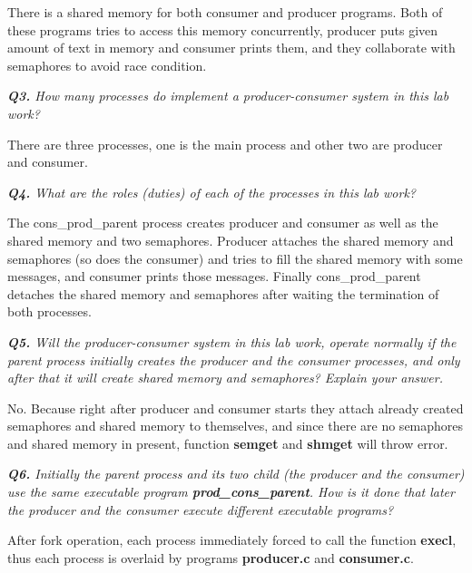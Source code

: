 \documentclass[11pt]{article}
\begin{document}
There is a shared memory for both consumer and producer programs. Both of these programs tries to access this memory concurrently, producer puts given amount of text in memory and consumer prints them, and they collaborate with semaphores to avoid race condition. 


\vspace{5mm}
\textit{\textbf{Q3.} How many processes do implement a producer-consumer system in this lab work?}
\vspace{5mm}

There are three processes, one is the main process and other two are producer and consumer.

\vspace{5mm}
\textit{\textbf{Q4.} What are the roles (duties) of each of the processes in this lab work?}
\vspace{5mm}

The cons\_prod\_parent process creates producer and consumer as well as the shared memory and two semaphores. Producer attaches the shared memory and semaphores (so does the consumer) and tries to fill the shared memory with some messages, and consumer prints those messages. Finally cons\_prod\_parent detaches the shared memory and semaphores after waiting the termination of both processes.

\vspace{5mm}
\textit{\textbf{Q5.} Will the producer-consumer system in this lab work, operate normally if the parent process initially creates the producer and the consumer processes, and only after that it will create shared memory and semaphores? Explain your answer.}
\vspace{5mm}

No. Because right after producer and consumer starts they attach already created semaphores and shared memory to themselves, and since there are no semaphores and shared memory in present, function \textbf{semget} and \textbf{shmget} will throw error.

\vspace{5mm}
\textit{\textbf{Q6.} Initially the parent process and its two child (the producer and the consumer) use the same executable program \textbf{prod\_cons\_parent}. How is it done that later the producer and the consumer execute different executable programs?}
\vspace{5mm}

After fork operation, each process immediately forced to call the function \textbf{execl}, thus each process is overlaid by programs \textbf{producer.c} and \textbf{consumer.c}.
\end{document}
